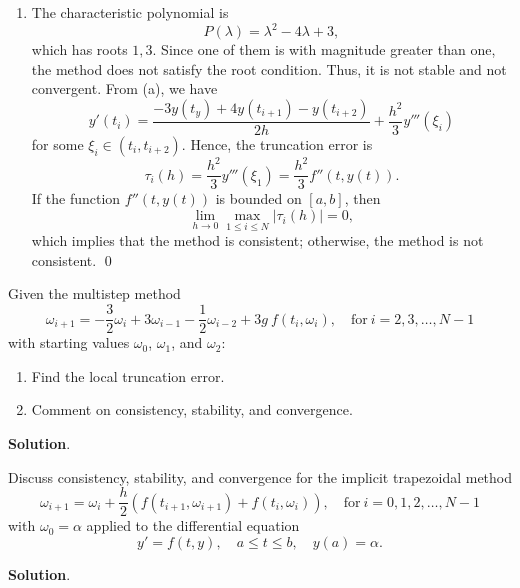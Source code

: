 \documentclass[11pt]{article}
\theoremstyle{break}
\numberwithin{equation}{theorem}
\begin{document}
\begin{enumerate}
\begin{center}
    \end{center}
    \item The characteristic polynomial is $$P(\lambda)=\lambda^2-4\lambda+3,$$ which has roots $1, 3$. Since one of them is with magnitude greater than one, the method does not satisfy the root condition. Thus, it is not stable and not convergent. From (a), we have $$y'(t_i)=\dfrac{-3y(t_y)+4y(t_{i+1})-y(t_{i+2})}{2h}+\dfrac{h^2}{3}y'''(\xi_i)$$ for some $\xi_i\in(t_i, t_{i+2})$. Hence, the truncation error is $$\tau_i(h)=\dfrac{h^2}{3}y'''(\xi_1)=\dfrac{h^2}{3}f''(t, y(t)).$$ If the function $f''(t, y(t))$ is bounded on $[a, b]$, then $$\lim_{h\to 0}\max_{1\leq i\leq N}|\tau_i(h)|=0,$$ which implies that the method is consistent; otherwise, the method is not consistent. \qed
\end{enumerate}


\newpage
\begin{problem}\label{problem 17} %
    Given the multistep method $$\omega_{i+1}=-\dfrac{3}{2}\omega_i+3\omega_{i-1}-\dfrac{1}{2}\omega_{i-2}+3g\:f(t_i, \omega_i), \quad \text{for}\ i=2,3,\dots, N-1$$ with starting values $\omega_0$, $\omega_1$, and $\omega_2$:
    \begin{enumerate}
        \item Find the local truncation error.
        \item Comment on consistency, stability, and convergence.
    \end{enumerate}
\end{problem}
\textbf{Solution}.


\newpage
\begin{problem}\label{problem 18} %
    Discuss consistency, stability, and convergence for the implicit trapezoidal method $$\omega_{i+1}=\omega_i+\dfrac{h}{2}\left(f(t_{i+1}, \omega_{i+1})+f(t_i, \omega_i)\right),\quad \text{for}\ i=0,1,2,\dots, N-1$$ with $\omega_0=\alpha$ applied to the differential equation $$y'=f(t, y), \quad a\leq t\leq b, \quad y(a)=\alpha.$$
\end{problem}
\textbf{Solution}.
\end{document}
